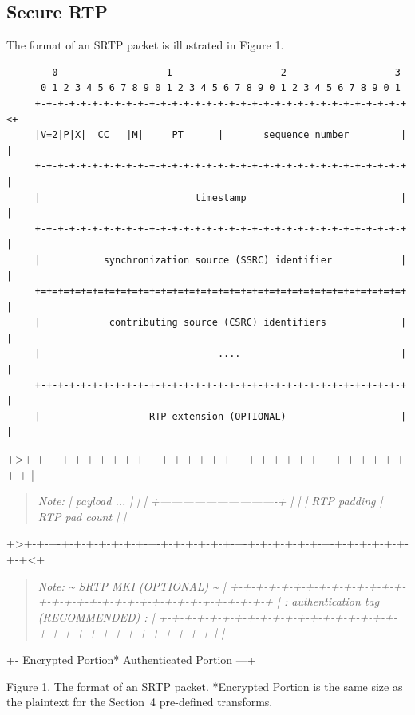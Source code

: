 \documentclass{article}
\begin{document}
\subsection{Secure RTP}

The format of an SRTP packet is illustrated in Figure 1.

\begin{verbatim}
        0                   1                   2                   3
      0 1 2 3 4 5 6 7 8 9 0 1 2 3 4 5 6 7 8 9 0 1 2 3 4 5 6 7 8 9 0 1
     +-+-+-+-+-+-+-+-+-+-+-+-+-+-+-+-+-+-+-+-+-+-+-+-+-+-+-+-+-+-+-+-+<+
     |V=2|P|X|  CC   |M|     PT      |       sequence number         | |
     +-+-+-+-+-+-+-+-+-+-+-+-+-+-+-+-+-+-+-+-+-+-+-+-+-+-+-+-+-+-+-+-+ |
     |                           timestamp                           | |
     +-+-+-+-+-+-+-+-+-+-+-+-+-+-+-+-+-+-+-+-+-+-+-+-+-+-+-+-+-+-+-+-+ |
     |           synchronization source (SSRC) identifier            | |
     +=+=+=+=+=+=+=+=+=+=+=+=+=+=+=+=+=+=+=+=+=+=+=+=+=+=+=+=+=+=+=+=+ |
     |            contributing source (CSRC) identifiers             | |
     |                               ....                            | |
     +-+-+-+-+-+-+-+-+-+-+-+-+-+-+-+-+-+-+-+-+-+-+-+-+-+-+-+-+-+-+-+-+ |
     |                   RTP extension (OPTIONAL)                    | |
\end{verbatim}

+>+-+-+-+-+-+-+-+-+-+-+-+-+-+-+-+-+-+-+-+-+-+-+-+-+-+-+-+-+-+-+-+-+ |

\begin{quote}
\textit{Note: |                          payload  ...                         | | |                               +-------------------------------+ | |                               | RTP padding   | RTP pad count | |}
\end{quote}

+>+-+-+-+-+-+-+-+-+-+-+-+-+-+-+-+-+-+-+-+-+-+-+-+-+-+-+-+-+-+-+-+-+<+

\begin{quote}
\textit{Note: \textasciitilde{}                     SRTP MKI (OPTIONAL)                       \textasciitilde{} | +-+-+-+-+-+-+-+-+-+-+-+-+-+-+-+-+-+-+-+-+-+-+-+-+-+-+-+-+-+-+-+-+ | :                 authentication tag (RECOMMENDED)              : | +-+-+-+-+-+-+-+-+-+-+-+-+-+-+-+-+-+-+-+-+-+-+-+-+-+-+-+-+-+-+-+-+ | |}
\end{quote}

+- Encrypted Portion*                      Authenticated Portion ---+

Figure 1.  The format of an SRTP packet.  *Encrypted Portion is the same size as the plaintext for the Section~4 pre-defined transforms.
\end{document}
